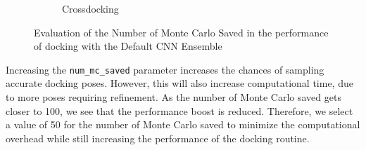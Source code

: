 \documentclass[journal=jcisd8,manuscript=article]{achemso}
\begin{document}
\begin{figure}
\begin{subfigure}[b]{0.48\textwidth}
		\caption{Crossdocking}
		\label{fig:mcsaved cd}
        \end{subfigure}    
	\caption{Evaluation of the Number of Monte Carlo Saved in the performance of docking with the Default CNN Ensemble}
	\label{fig:mcsaved}
\end{figure}    

Increasing the \texttt{num\_mc\_saved} parameter increases the chances of sampling accurate docking poses. However, this will also increase computational time, due to more poses requiring refinement. As the number of Monte Carlo saved gets closer to 100, we see that the performance boost is reduced. Therefore, we select a value of 50 for the number of Monte Carlo saved to minimize the computational overhead while still increasing the performance of the docking routine.  
\end{document}
